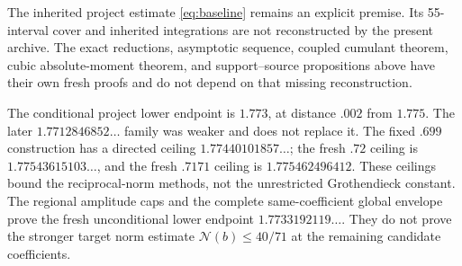 \documentclass[11pt]{article}
\newcommand{\N}{\mathcal N}
\begin{document}
The inherited project estimate \eqref{eq:baseline} remains an
explicit premise. Its 55-interval cover and inherited integrations are
not reconstructed by the present archive. The exact reductions,
asymptotic sequence, coupled cumulant theorem, cubic absolute-moment
theorem, and support--source propositions above have their own fresh
proofs and do not depend on that missing reconstruction.

The conditional project lower endpoint is $1.773$, at distance $.002$ from
$1.775$. The later $1.7712846852\ldots$ family was weaker and does not
replace it. The fixed $.699$ construction has a directed ceiling
$1.77440101857\ldots$; the fresh $.72$ ceiling is
$1.77543615103\ldots$, and the fresh $.7171$ ceiling is
$1.775462496412$. These ceilings bound the reciprocal-norm methods,
not the unrestricted Grothendieck constant. The regional amplitude
caps and the complete same-coefficient global envelope prove the fresh
unconditional lower endpoint $1.7733192119\ldots$. They do not prove
the stronger target norm estimate $\N(b)\le40/71$ at the remaining candidate coefficients.
\end{document}
